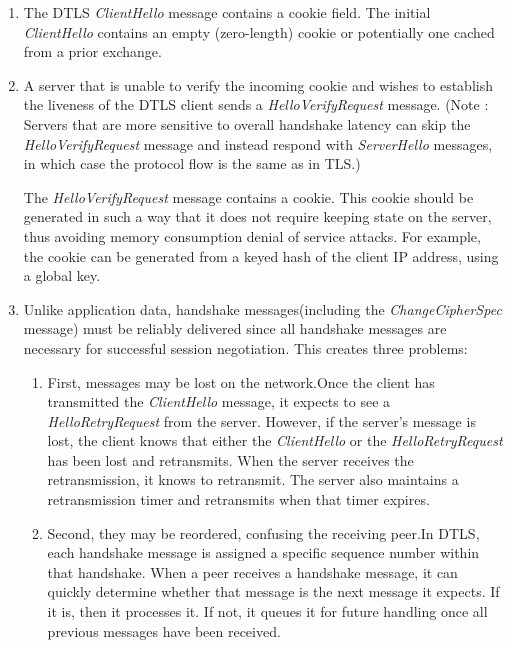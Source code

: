 \begin{enumerate}
\item The DTLS \textit{ClientHello} message contains a cookie field. The initial \textit{ClientHello} contains an empty (zero-length) cookie or potentially one cached from a prior exchange.

\item A server that is unable to verify the incoming cookie and wishes to establish the liveness of the DTLS client sends a \textit{HelloVerifyRequest} message. (Note : Servers that are more sensitive to overall handshake latency can skip the \textit{HelloVerifyRequest} message and instead respond with \textit{ServerHello} messages, in which case the protocol flow is the same as in TLS.)

\par The \textit{HelloVerifyRequest} message contains a cookie. This cookie should be generated in such a way that it does not require keeping state on the server, thus avoiding memory consumption denial of service attacks. For example, the cookie can be generated from a keyed hash of the client IP address, using a global key.

\item Unlike application data, handshake messages(including the \textit{ChangeCipherSpec} message) must be reliably delivered since all handshake messages are necessary for successful session negotiation. This creates three problems: 
\begin{enumerate}
\item First, messages may be lost on the network.Once the client has transmitted the \textit{ClientHello} message, it expects to see a \textit{HelloRetryRequest} from the server. However, if the server’s message is lost, the client knows that either the \textit{ClientHello} or the \textit{HelloRetryRequest} has been lost and retransmits. When the server receives the retransmission, it knows to retransmit. The server also maintains a retransmission timer and retransmits when that timer expires.
	
\item	Second, they may be reordered, confusing the receiving peer.In DTLS, each handshake message is assigned a specific sequence number within that handshake. When a peer receives a handshake message, it can quickly determine whether that message is the next message it expects. If it is, then it processes it. If not, it queues it for future handling once all previous messages have been received.


\end{enumerate}
\end{enumerate}
